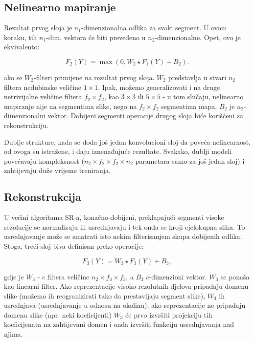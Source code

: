 \documentclass[12pt]{report}
\numberwithin{equation}{section}
\begin{document}
\subsection{Nelinearno mapiranje}

Rezultat prvog sloja je $n_1$-dimenzionalna odlika za svaki segment. U ovom koraku, tih $n_1$-dim. vektora će biti prevedeno u $n_2$-dimenzionalne. Opet, ovo je ekvivalento:

\begin{equation}
  F_2(Y) = \max(0, W_2 \star F_1(Y) + B_2).
\end{equation}

ako se $W_2$-filteri primijene na rezultat prvog sloja. $W_2$ predstavlja u stvari $n_2$ filtera nedubinske veličine $1 \times 1$. Ipak, možemo generalizovati i na druge netrivijalne veličine filtera $f_2 \times f_2$, kao $3 \times 3$  ili $5 \times 5$ - u tom slučaju, nelinearno mapiranje nije na segmentima slike, nego na $f_2 \times f_2$ segmentima mapa. $B_2$ je $n_2$-dimenzionalni vektor. Dobijeni segmenti operacije drugog sloja biće korišćeni za rekonstrukciju. 

Dublje strukture, kada se doda još jedan konvolucioni sloj da poveća nelinearnost, od ovoga su istražene, i daju iznenađujuće rezultate. Svakako, dublji modeli povećavaju kompleksnost ($n_2 \times f_2 \times f_2 \times n_2$ parametara samo za još jedan sloj) i zahtijevaju duže vrijeme treniranja.  

\subsection{Rekonstrukcija}

U većini algoritama SR-a, konačno-dobijeni, preklapajući segmenti visoke rezolucije se normalizuju ili usrednjavaju  i tek onda se kroji cjelokupna slika. To usrednjavanje može se smatrati isto nekim filterisanjem skupa dobijenih odlika.  Stoga, treći sloj biva definisan preko operacije:

 
\begin{equation}
  F_3(Y) =  W_3 \star F_3(Y) + B_3,
\end{equation}

gdje je $W_3$ - $c$ filtera veličine $n_2 \times f_3 \times f_3$, a $B_3$ $c$-dimenzioni vektor. $W_3$ se ponaša kao linearni filter. Ako reprezentacije visoko-rezolutnih djelova pripadaju domenu slike (možemo ih reogranizirati tako da prestavljaju segment slike), $W_3$ ih usrednjava (usrednjavanje u odnosu na okolinu); ako reprezentacije ne pripadaju domenu slike (npr. neki koeficijenti) $W_3$ će prvo izvršiti projekciju tih koeficijenata na zahtijevani domen i onda izvršiti funkciju usrednjavanja nad njima.
\end{document}
